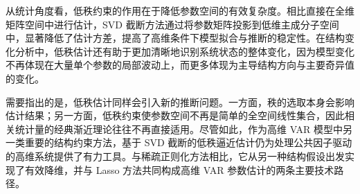 \documentclass[UTF8,a4paper,12pt]{ctexbook}
\begin{document}
从统计角度看，低秩约束的作用在于降低参数空间的有效复杂度。相比直接在全维矩阵空间中进行估计，SVD 截断方法通过将参数矩阵投影到低维主成分子空间中，显著降低了估计方差，提高了高维条件下模型拟合与推断的稳定性。在结构变化分析中，低秩估计还有助于更加清晰地识别系统状态的整体变化，因为模型变化不再体现在大量单个参数的局部波动上，而更多体现为主导结构方向与主要奇异值的变化。

需要指出的是，低秩估计同样会引入新的推断问题。一方面，秩的选取本身会影响估计结果；另一方面，低秩约束使参数空间不再是简单的全空间线性集合，因此相关统计量的经典渐近理论往往不再直接适用。尽管如此，作为高维 VAR 模型中另一类重要的结构约束方法，基于 SVD 截断的低秩逼近估计仍为处理公共因子驱动的高维系统提供了有力工具。与稀疏正则化方法相比，它从另一种结构假设出发实现了有效降维，并与 Lasso 方法共同构成高维 VAR 参数估计的两条主要技术路径。
\end{document}

